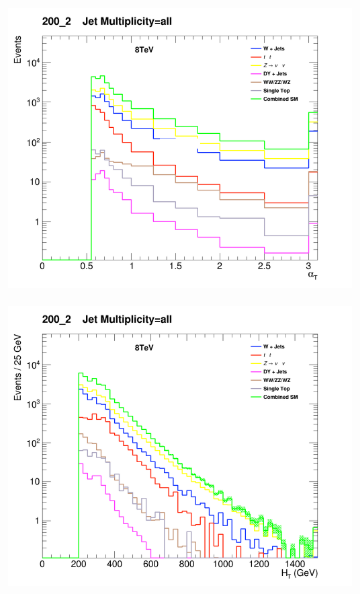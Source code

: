 \begin{figure}[!ht]
  \centering
    \begin{subfigure}[b]{0.48\textwidth}
      \includegraphics[width=\textwidth]{Figs/datamc/had/v1/AlphaT_all_200_upwards}
      \caption{\alphat}
    \end{subfigure}
    \begin{subfigure}[b]{0.48\textwidth}
      \includegraphics[width=\textwidth]{Figs/datamc/had/v1/HT_all_200_upwards}
      \caption{\HT}
    \end{subfigure} \\

\end{figure}
